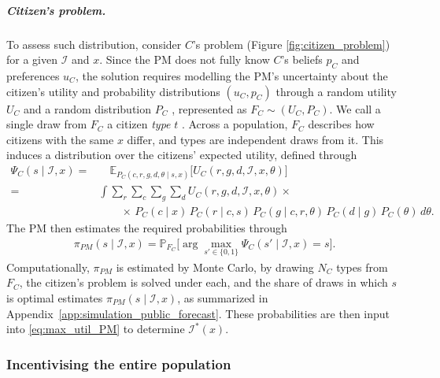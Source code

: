 \documentclass[12pt]{article}
\begin{document}
\subparagraph{Citizen's problem.} To assess such distribution, consider $C$'s problem (Figure \ref{fig:citizen_problem}) for a given $\mathcal{I}$ and $x$. Since the PM does not fully know $C$'s beliefs $p_C$ and preferences $u_C$, the solution requires modelling the PM's uncertainty about the citizen's utility and probability distributions $(u_{C}, p_{C})$ through a random utility $U_C$ and a random distribution $P_C$ \citep{rios2009adversarial}, represented as $ F_C  \sim ( U_C, P_C )$. We call a single draw from $F_C$ a citizen \emph{type} $t$ \citep{assaf2020bayesian}. Across a population, $F_C$ describes how citizens with the same $x$ differ, and types are independent draws from it. This induces a distribution over the citizens' expected utility, defined through 
\begin{align}\label{eq:randexp}
    \Psi_C (s \mid \mathcal{I} , x) = & \quad \mathbb{E}_{P_{C}(c,r,g,d,\theta \mid s, x)} \big[U_C(r,g,d,\mathcal{I},x, \theta) \big]  \\
    = & \int \sum_{r} \sum_{c} \sum_{g} \sum_{d} U_C(r,g,d, \mathcal{I},x,\theta) \times \nonumber \\
     & \qquad  \times \, P_C(c \mid x)\, P_C(r \mid c,s)\, P_C(g \mid c,r,\theta)\, P_C(d \mid g)\, P_C(\theta) \, d\theta. \nonumber
\end{align}
The PM then estimates the required probabilities through
\begin{align}\label{eq:probPM}
    \pi_{PM}(s \mid \mathcal{I}, x) = \mathbb{P}_{F_C}\big[\arg \max_{s' \in \{0,1\}} \Psi_C (s' \mid \mathcal{I} , x) = s\big].
\end{align}
Computationally, $\pi_{PM}$ is estimated by Monte Carlo, by drawing $N_C$ types from $F_C$, the citizen's problem is solved under each, and the share of draws in which $s$ is optimal estimates $\pi_{PM}(s \mid \mathcal{I}, x)$, as summarized in Appendix~\ref{app:simulation_public_forecast}. These probabilities are then input into \eqref{eq:max_util_PM} to determine $\mathcal{I}^*(x)$.



\subsubsection{Incentivising the entire population}\label{sec:incent}
\end{document}
